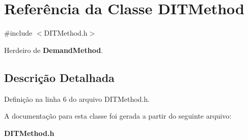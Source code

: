 \section{Referência da Classe D\+I\+T\+Method}
\label{class_d_i_t_method}


{\ttfamily \#include $<$D\+I\+T\+Method.\+h$>$}



Herdeiro de {\bf Demand\+Method}.



\subsection{Descrição Detalhada}


Definição na linha 6 do arquivo D\+I\+T\+Method.\+h.



A documentação para esta classe foi gerada a partir do seguinte arquivo\+:\begin{DoxyCompactItemize}
\item 
{\bf D\+I\+T\+Method.\+h}\end{DoxyCompactItemize}

